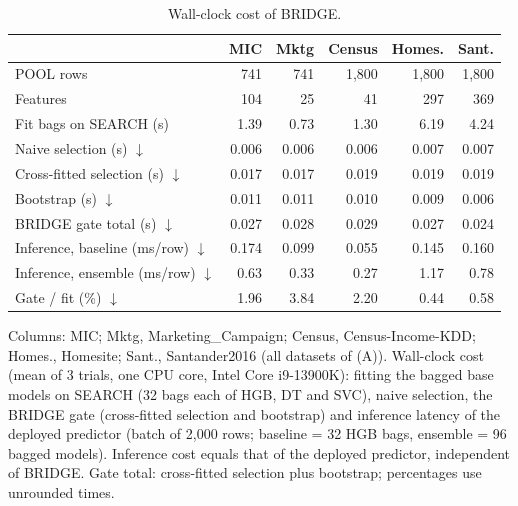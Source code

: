 \begin{table}[!htb]
\centering
\scriptsize
\setlength{\tabcolsep}{2.4pt}
\caption{Wall-clock cost of BRIDGE.}
\label{tab:complexity}
\begin{tabular}{@{}lrrrrr@{}}
\toprule
 & MIC & Mktg & Census & Homes. & Sant. \\
\midrule
POOL rows & 741 & 741 & 1,800 & 1,800 & 1,800 \\
Features & 104 & 25 & 41 & 297 & 369 \\
Fit bags on SEARCH (s) & 1.39 & 0.73 & 1.30 & 6.19 & 4.24 \\
Naive selection (s) $\downarrow$ & 0.006 & 0.006 & 0.006 & 0.007 & 0.007 \\
Cross-fitted selection (s) $\downarrow$ & 0.017 & 0.017 & 0.019 & 0.019 & 0.019 \\
Bootstrap (s) $\downarrow$ & 0.011 & 0.011 & 0.010 & 0.009 & 0.006 \\
BRIDGE gate total (s) $\downarrow$ & 0.027 & 0.028 & 0.029 & 0.027 & 0.024 \\
Inference, baseline (ms/row) $\downarrow$ & 0.174 & 0.099 & 0.055 & 0.145 & 0.160 \\
Inference, ensemble (ms/row) $\downarrow$ & 0.63 & 0.33 & 0.27 & 1.17 & 0.78 \\
Gate / fit (\%) $\downarrow$ & 1.96 & 3.84 & 2.20 & 0.44 & 0.58 \\
\bottomrule
\end{tabular}

\vspace{2pt}
\parbox{\linewidth}{\justifying\scriptsize *Columns: MIC; Mktg, Marketing\_Campaign; Census, Census-Income-KDD; Homes., Homesite; Sant., Santander2016 (all datasets of (A)). Wall-clock cost (mean of 3 trials, one CPU core, Intel Core i9-13900K): fitting the bagged base models on SEARCH (32 bags each of HGB, DT and SVC), naive selection, the BRIDGE gate (cross-fitted selection and bootstrap) and inference latency of the deployed predictor (batch of 2,000 rows; baseline = 32 HGB bags, ensemble = 96 bagged models). Inference cost equals that of the deployed predictor, independent of BRIDGE. Gate total: cross-fitted selection plus bootstrap; percentages use unrounded times.}
\end{table}
